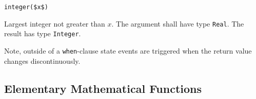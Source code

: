 \begin{operatordefinition}[integer]
\begin{synopsis}\begin{lstlisting}
integer($x$)
\end{lstlisting}\end{synopsis}
\begin{semantics}
Largest integer not greater than $x$.
The argument shall have type \lstinline!Real!.
The result has type \lstinline!Integer!.
\begin{nonnormative}
Note, outside of a \lstinline!when!-clause state events are triggered when the return value changes discontinuously.
\end{nonnormative}
\end{semantics}
\end{operatordefinition}

\subsection{Elementary Mathematical Functions}\label{built-in-mathematical-functions-and-external-built-in-functions}

